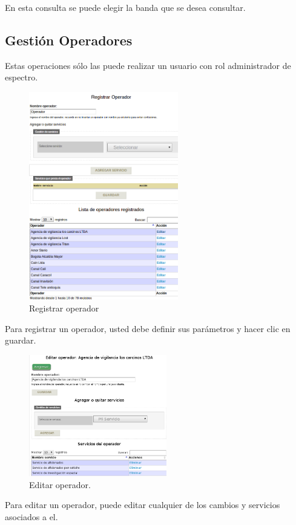 \begin{multicols}{2}
En esta consulta se puede elegir la banda que se desea consultar.

\subsection*{Gestión Operadores}

Estas operaciones sólo las puede realizar un usuario con rol administrador de espectro.

\begin{figure}[H]
	\centering
	\includegraphics[width=6.5cm]{Anexos/Imagenes/ManualUsuario/Operador.png}
	\caption{Registrar operador}
\end{figure}

Para registrar un operador, usted debe definir sus parámetros y hacer clic en guardar.
	

\begin{figure}[H]
	\centering
	\includegraphics[width=6cm]{Anexos/Imagenes/ManualUsuario/OperadorEditar.png}
	\caption{Editar operador.}
\end{figure}

Para editar un operador, puede editar cualquier de los cambios y servicios asociados a el.
	

\end{multicols}
